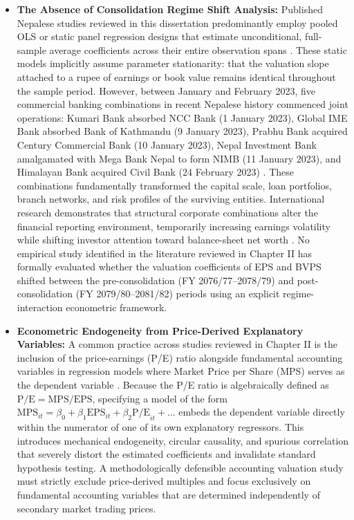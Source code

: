 \begin{itemize}
\item \textbf{The Absence of Consolidation Regime Shift Analysis:}
Published Nepalese studies reviewed in this dissertation predominantly employ pooled OLS or static panel regression designs that estimate unconditional, full-sample average coefficients across their entire observation spans \citep{bhattarai2014,chaudhari2025,timalsina2026}. These static models implicitly assume parameter stationarity: that the valuation slope attached to a rupee of earnings or book value remains identical throughout the sample period. However, between January and February 2023, five commercial banking combinations in recent Nepalese history commenced joint operations: Kumari Bank absorbed NCC Bank (1 January 2023), Global IME Bank absorbed Bank of Kathmandu (9 January 2023), Prabhu Bank acquired Century Commercial Bank (10 January 2023), Nepal Investment Bank amalgamated with Mega Bank Nepal to form NIMB (11 January 2023), and Himalayan Bank acquired Civil Bank (24 February 2023) \citep{nrb2023bsr}. These combinations fundamentally transformed the capital scale, loan portfolios, branch networks, and risk profiles of the surviving entities. International research demonstrates that structural corporate combinations alter the financial reporting environment, temporarily increasing earnings volatility while shifting investor attention toward balance-sheet net worth \citep{kwon2020}. No empirical study identified in the literature reviewed in Chapter II has formally evaluated whether the valuation coefficients of EPS and BVPS shifted between the pre-consolidation (FY 2076/77--2078/79) and post-consolidation (FY 2079/80--2081/82) periods using an explicit regime-interaction econometric framework.

\item \textbf{Econometric Endogeneity from Price-Derived Explanatory Variables:}
A common practice across studies reviewed in Chapter II is the inclusion of the price-earnings (P/E) ratio alongside fundamental accounting variables in regression models where Market Price per Share (MPS) serves as the dependent variable \citep{bhattarai2014,chhetri2023,giri2024,gurungdahal2025,joshi2023,pant2024}. Because the P/E ratio is algebraically defined as $\text{P/E} = \text{MPS} / \text{EPS}$, specifying a model of the form $\text{MPS}_{it} = \beta_0 + \beta_1 \text{EPS}_{it} + \beta_2 \text{P/E}_{it} + \dots$ embeds the dependent variable directly within the numerator of one of its own explanatory regressors. This introduces mechanical endogeneity, circular causality, and spurious correlation that severely distort the estimated coefficients and invalidate standard hypothesis testing. A methodologically defensible accounting valuation study must strictly exclude price-derived multiples and focus exclusively on fundamental accounting variables that are determined independently of secondary market trading prices.


\end{itemize}
